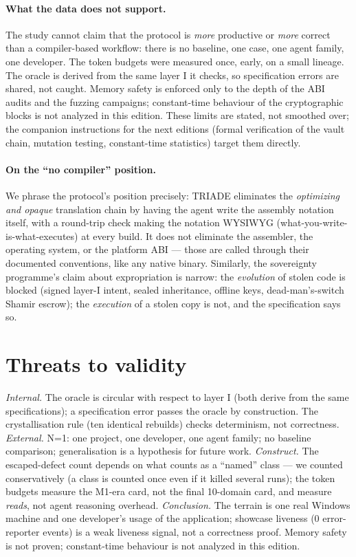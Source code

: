 \documentclass[11pt,a4paper]{article}
\begin{document}
\paragraph{What the data does not support.} The study cannot claim that
the protocol is \emph{more} productive or \emph{more} correct than a
compiler-based workflow: there is no baseline, one case, one agent
family, one developer. The token budgets were measured once, early, on a
small lineage. The oracle is derived from the same layer I it checks, so
specification errors are shared, not caught. Memory safety is enforced
only to the depth of the ABI audits and the fuzzing campaigns;
constant-time behaviour of the cryptographic blocks is not analyzed in
this edition. These limits are stated, not smoothed over; the companion
instructions for the next editions (formal verification of the vault
chain, mutation testing, constant-time statistics) target them directly.

\paragraph{On the ``no compiler'' position.} We phrase the protocol's
position precisely: TRIADE eliminates the \emph{optimizing and opaque}
translation chain by having the agent write the assembly notation itself,
with a round-trip check making the notation WYSIWYG
(what-you-write-is-what-executes) at every build. It does not eliminate
the assembler, the operating system, or the platform ABI --- those are
called through their documented conventions, like any native binary.
Similarly, the sovereignty programme's claim about expropriation is
narrow: the \emph{evolution} of stolen code is blocked (signed layer-I
intent, sealed inheritance, offline keys, dead-man's-switch Shamir
escrow); the \emph{execution} of a stolen copy is not, and the
specification says so.

\section{Threats to validity}\label{sec:threats}

\emph{Internal.} The oracle is circular with respect to layer I
(both derive from the same specifications); a specification error passes
the oracle by construction. The crystallisation rule (ten identical
rebuilds) checks determinism, not correctness. \emph{External.} N=1: one
project, one developer, one agent family; no baseline comparison;
generalisation is a hypothesis for future work. \emph{Construct.} The
escaped-defect count depends on what counts as a ``named'' class --- we
counted conservatively (a class is counted once even if it killed several
runs); the token budgets measure the M1-era card, not the final
10-domain card, and measure \emph{reads}, not agent reasoning overhead.
\emph{Conclusion.} The terrain is one real Windows machine and one
developer's usage of the application; showcase liveness (0 error-reporter
events) is a weak liveness signal, not a correctness proof. Memory safety
is not proven; constant-time behaviour is not analyzed in this edition.
\end{document}
